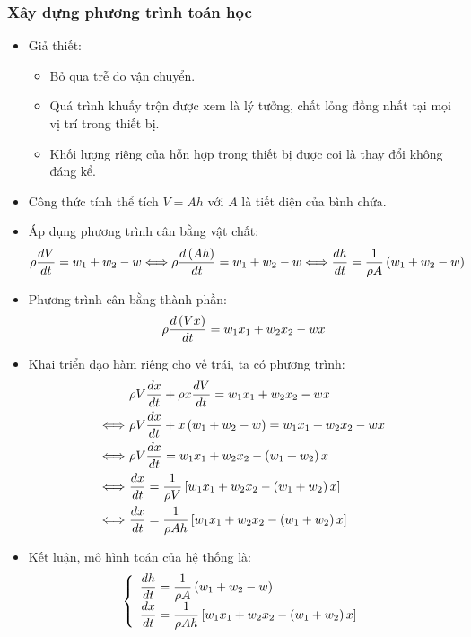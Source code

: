 \subsubsection{Xây dựng phương trình toán học}
    \begin{itemize}
        \item Giả thiết:
            \begin{itemize}
                \item Bỏ qua trễ do vận chuyển.
                \item Quá trình khuấy trộn được xem là lý tưởng, chất lỏng đồng nhất tại mọi vị trí trong thiết bị.
                \item Khối lượng riêng của hỗn hợp trong thiết bị được coi là thay đổi không đáng kể.
            \end{itemize}
        \item Công thức tính thể tích $V = Ah$ với $A$ là tiết diện của bình chứa.
        \item Áp dụng phương trình cân bằng vật chất:
            \begin{align*}
                \rho \dfrac{dV}{dt} = w_1 + w_2 - w \Longleftrightarrow \rho \dfrac{d\left({Ah}\right)}{dt} = w_1 + w_2 - w \Longleftrightarrow \dfrac{dh}{dt} = \dfrac{1}{\rho A} \left({w_1 + w_2 - w}\right)
            \end{align*}
        \item Phương trình cân bằng thành phần:
            \begin{align*}
                \rho \dfrac{d\left({Vx}\right)}{dt} = w_1x_1 + w_2x_2 - wx
            \end{align*}
        \item Khai triển đạo hàm riêng cho vế trái, ta có phương trình:
            \begin{align*}
                & \rho V \dfrac{dx}{dt} + \rho x \dfrac{dV}{dt} = w_1x_1 + w_2x_2 - wx\\
                \Longleftrightarrow~ & \rho V \dfrac{dx}{dt} + x \left({w_1 + w_2 - w}\right) = w_1x_1 + w_2x_2 - wx\\
                \Longleftrightarrow~ & \rho V \dfrac{dx}{dt} = w_1x_1 + w_2x_2 - \left({w_1 + w_2}\right)x\\
                \Longleftrightarrow~ & \dfrac{dx}{dt} = \dfrac{1}{\rho V} \left[{w_1x_1 + w_2x_2 - \left({w_1 + w_2}\right)x}\right]\\
                \Longleftrightarrow~ & \dfrac{dx}{dt} = \dfrac{1}{\rho A h} \left[{w_1x_1 + w_2x_2 - \left({w_1 + w_2}\right)x}\right]
            \end{align*}
        \item Kết luận, mô hình toán của hệ thống là:
            \begin{align*}
                \left\{\begin{array}{l}
                    \dfrac{dh}{dt}  = \dfrac{1}{\rho A} \left({w_1 + w_2 - w}\right)\\
                    \dfrac{dx}{dt}  = \dfrac{1}{\rho A h} \left[{w_1x_1 + w_2x_2 - \left({w_1 + w_2}\right)x}\right]
                \end{array}\right.
            \end{align*}
    \end{itemize}

